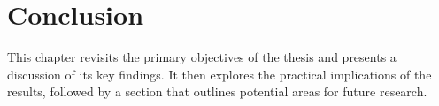 \chapter{Conclusion}
\label{chap:Conclusion}
This chapter revisits the primary objectives of the thesis and presents a discussion of its key findings. It then explores the practical implications of the results, followed by a section that outlines potential areas for future research.



